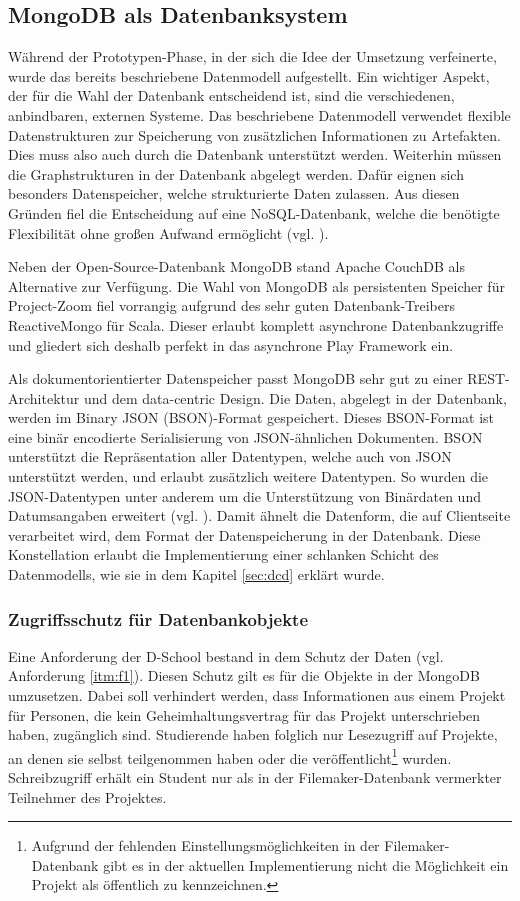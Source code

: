 \subsection{MongoDB als Datenbanksystem}
Während der Prototypen-Phase, in der sich die Idee der Umsetzung verfeinerte, wurde das bereits beschriebene Datenmodell aufgestellt. Ein wichtiger Aspekt, der für die Wahl der Datenbank entscheidend ist, sind die verschiedenen, anbindbaren, externen Systeme. Das beschriebene Datenmodell verwendet flexible Datenstrukturen zur Speicherung von zusätzlichen Informationen zu \gls{Artefakt}en. Dies muss also auch durch die Datenbank unterstützt werden. Weiterhin müssen die Graphstrukturen in der Datenbank abgelegt werden. Dafür eignen sich besonders Datenspeicher, welche strukturierte Daten zulassen. Aus diesen Gründen fiel die Entscheidung auf eine NoSQL-Datenbank, welche die benötigte Flexibilität ohne großen Aufwand ermöglicht (vgl. \cite{mysgl-to-nosql}).

Neben der Open-Source-Datenbank MongoDB stand Apache CouchDB als Alternative zur Verfügung. Die Wahl von MongoDB als persistenten Speicher für Project-Zoom fiel vorrangig aufgrund des sehr guten Datenbank-Treibers ReactiveMongo für Scala. Dieser erlaubt komplett asynchrone Datenbankzugriffe und gliedert sich deshalb perfekt in das asynchrone Play \gls{Framework} ein.

Als dokumentorientierter Datenspeicher passt MongoDB sehr gut zu einer REST-Architektur und dem data-centric Design. Die Daten, abgelegt in der Datenbank, werden im Binary JSON (BSON)-Format gespeichert. Dieses BSON-Format ist eine binär encodierte Serialisierung von JSON-ähnlichen Dokumenten. BSON unterstützt die Repräsentation aller Datentypen, welche auch von JSON unterstützt werden, und erlaubt zusätzlich weitere Datentypen. So wurden die JSON-Datentypen unter anderem um die Unterstützung von Binärdaten und Datumsangaben erweitert (vgl. \cite{bson}). Damit ähnelt die Datenform, die auf Clientseite verarbeitet wird, dem Format der Datenspeicherung in der Datenbank. Diese Konstellation erlaubt die Implementierung einer schlanken Schicht des Datenmodells, wie sie in dem Kapitel \ref{sec:dcd} erklärt wurde.

\subsubsection{Zugriffsschutz für Datenbankobjekte}

Eine Anforderung der D-School bestand in dem Schutz der Daten (vgl. Anforderung \ref{itm:f1}). Diesen Schutz gilt es für die Objekte in der MongoDB umzusetzen. Dabei soll verhindert werden, dass Informationen aus einem Projekt für Personen, die kein Geheimhaltungsvertrag für das Projekt unterschrieben haben, zugänglich sind. Studierende haben folglich nur Lesezugriff auf Projekte, an denen sie selbst teilgenommen haben oder die veröffentlicht\footnote{Aufgrund der fehlenden Einstellungsmöglichkeiten in der Filemaker-Datenbank gibt es in der aktuellen Implementierung nicht die Möglichkeit ein Projekt als öffentlich zu kennzeichnen.} wurden. Schreibzugriff erhält ein Student nur als in der Filemaker-Datenbank vermerkter Teilnehmer des Projektes.

